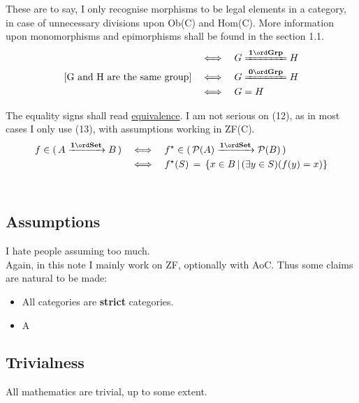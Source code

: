 These are to say, I only recognise morphisms to be legal elements in a category, in case of unnecessary divisions upon Ob(C) and Hom(C). More information upon monomorphisms and epimorphisms shall be found in the section 1.1.\\

\begin{align}
  [\text{G and H are isomorphic in groups}] &\corres G\iso{Grp} H \\
  [\text{G and H are the same group}] &\corres G\iso[0]{Grp} H \\
                                            &\corres G = H
\end{align} 

The equality signs shall read \href{https://ncatlab.org/nlab/show/equivalence}{equivalence}. I am not serious on (12), as in most cases I only use (13), with assumptions working in ZF(C). \\

\begin{align}
  f\in \col{A\func B} &\corres f^{\star}\in \col{\pset(A) \func \pset(B)} \\
                      &\corres f^{\star}(S)\,=\, \{x\in B \,|\, (\exists y\in S)(f(y)=x) \}
\end{align} \\

\subsection{Assumptions}

I hate people assuming too much. \\

Again, in this note I mainly work on ZF, optionally with AoC. Thus some claims are natural to be made:
\begin{itemize}
  \item All categories are \textbf{strict} categories.
  \item A
\end{itemize}


\subsection{Trivialness}

All mathematics are trivial, up to some extent.
